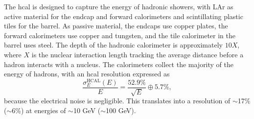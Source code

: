 The \gls{hcal} is designed to capture the energy of hadronic showers, with LAr as active material for the endcap and forward calorimeters and scintillating plastic tiles for the barrel. As passive material, the endcaps use copper plates, the forward calorimeters use copper and tungsten, and the tile calorimeter in the barrel uses steel. The depth of the hadronic calorimeter is approximately $10 X$, where $X$ is the nuclear interaction length tracking the average distance before a hadron interacts with a nucleus. The calorimeters collect the majority of the energy of hadrons, with an \gls{hcal} resolution expressed as \cite{Cavallari_2011}
\begin{equation}
  \frac{\sigma_E^{\text{HCAL}}(E)}{E} = \frac{52.9\%}{\sqrt{E}} \oplus 5.7\%,
\end{equation}
because the electrical noise is negligible. This translates into a resolution of $\sim$17\% ($\sim$6\%) at energies of $\sim$10 GeV ($\sim$100 GeV).

